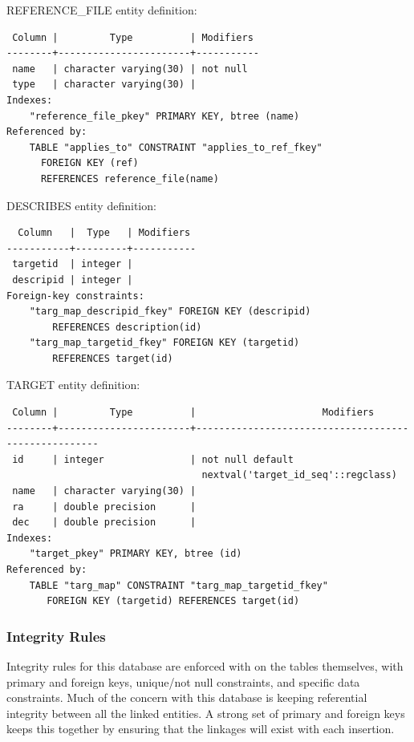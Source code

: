 \documentclass[a4paper,11pt]{article}
\begin{document}
\hrulefill


REFERENCE\_FILE entity definition:
\begin{verbatim}
 Column |         Type          | Modifiers 
--------+-----------------------+-----------
 name   | character varying(30) | not null
 type   | character varying(30) | 
Indexes:
    "reference_file_pkey" PRIMARY KEY, btree (name)
Referenced by:
    TABLE "applies_to" CONSTRAINT "applies_to_ref_fkey" 
      FOREIGN KEY (ref) 
      REFERENCES reference_file(name)

\end{verbatim}

\hrulefill

DESCRIBES entity definition:
\begin{verbatim}
  Column   |  Type   | Modifiers 
-----------+---------+-----------
 targetid  | integer | 
 descripid | integer | 
Foreign-key constraints:
    "targ_map_descripid_fkey" FOREIGN KEY (descripid) 
        REFERENCES description(id)
    "targ_map_targetid_fkey" FOREIGN KEY (targetid) 
        REFERENCES target(id)
\end{verbatim}

\hrulefill

TARGET entity definition:
\begin{verbatim}
 Column |         Type          |                      Modifiers                      
--------+-----------------------+-----------------------------------------------------
 id     | integer               | not null default 
                                  nextval('target_id_seq'::regclass)
 name   | character varying(30) | 
 ra     | double precision      | 
 dec    | double precision      | 
Indexes:
    "target_pkey" PRIMARY KEY, btree (id)
Referenced by:
    TABLE "targ_map" CONSTRAINT "targ_map_targetid_fkey"
       FOREIGN KEY (targetid) REFERENCES target(id)
\end{verbatim}

\hrulefill

\subsubsection{Integrity Rules}
Integrity rules for this database are enforced with on the tables themselves, with primary and foreign keys, unique/not null constraints, and specific data constraints. Much of the concern with this database is keeping referential integrity between all the linked entities.  A strong set of primary and foreign keys keeps this together by ensuring that the linkages will exist with each insertion.  
\end{document}
